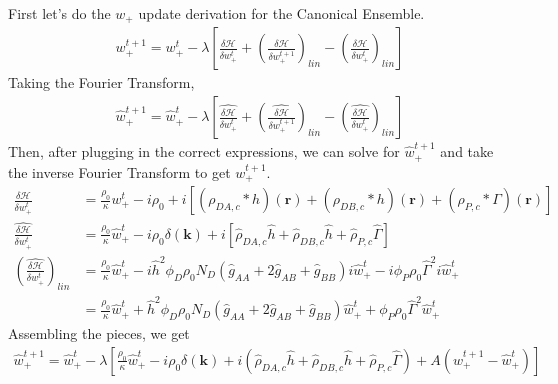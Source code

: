 \documentclass{article}
\begin{document}
  First let's do the $w_+$ update derivation for the Canonical Ensemble.
  \begin{align*}
    w_+^{t+1} =
      w_+^t - \lambda \left[
        \frac{\delta \mathcal{H}}{\delta w_+^t}
        + \left(  \frac{\delta \mathcal{H}}{\delta w_+^{t+1}} \right) _{lin}
        - \left(  \frac{\delta \mathcal{H}}{\delta w_+^{t}} \right) _{lin}
      \right]
  \end{align*}
  Taking the Fourier Transform,
  \begin{align*}
    \hat{w}_+^{t+1} =
      \hat{w}_+^t - \lambda \left[
        \hat{\frac{\delta \mathcal{H}}{\delta w_+^t}}
        + \left( \hat{ \frac{\delta \mathcal{H}}{\delta w_+^{t+1}}} \right) _{lin}
        - \left( \hat{ \frac{\delta \mathcal{H}}{\delta w_+^{t}}} \right) _{lin}
      \right]
  \end{align*}
  Then, after plugging in the correct expressions, we can solve for
    $\hat{w}_+^{t+1}$ and take the inverse Fourier Transform to get $w_+^{t+1}$.
  \begin{align*}
    \frac{\delta \mathcal{H}}{\delta w_+^t} &=
      \frac{\rho_0}{\kappa} w_+^t
      - i\rho_0
      + i [ (\rho_{DA,c} \ast h)(\mathbf{r})
            + (\rho_{DB,c} \ast h)(\mathbf{r})
            + (\rho_{P,c} \ast \Gamma)(\mathbf{r}) ] \\
    \hat{\frac{\delta \mathcal{H}}{\delta w_+^t}} &=
      \frac{\rho_0}{\kappa} \hat{w}_+^t
      - i \rho_0 \delta(\mathbf{k})
      + i [ \hat{\rho}_{DA,c} \hat{h}
            + \hat{\rho}_{DB,c} \hat{h}
            + \hat{\rho}_{P,c}  \hat{\Gamma} ] \\
    \left( \hat{\frac{\delta \mathcal{H}}{\delta w_+^t}} \right) _{lin} &=
      \frac{\rho_0}{\kappa} \hat{w}_+^t
      - i \hat{h}^2 \phi_D \rho_0 N_D
        (\hat{g}_{AA} + 2 \hat{g}_{AB} + \hat{g}_{BB}) i \hat{w}_+^t
      - i \phi_P \rho_0 \hat{\Gamma}^2 i \hat{w}_+^t \\
    &= \frac{\rho_0}{\kappa} \hat{w}_+^t
      + \hat{h}^2 \phi_D \rho_0 N_D
        (\hat{g}_{AA} + 2 \hat{g}_{AB} + \hat{g}_{BB}) \hat{w}_+^t
      + \phi_P \rho_0 \hat{\Gamma}^2 \hat{w}_+^t
  \end{align*}
  Assembling the pieces, we get
  \begin{align*}
    \hat{w}_+^{t+1} =
      \hat{w}_+^t - \lambda \left[
        \frac{\rho_0}{\kappa} \hat{w}_+^t
        - i \rho_0 \delta(\mathbf{k})
        + i ( \hat{\rho}_{DA,c} \hat{h}
              + \hat{\rho}_{DB,c} \hat{h}
              + \hat{\rho}_{P,c}  \hat{\Gamma} )
        + A (\hat{w}_+^{t+1} - \hat{w}_+^t)
      \right]
  \end{align*}
\end{document}
